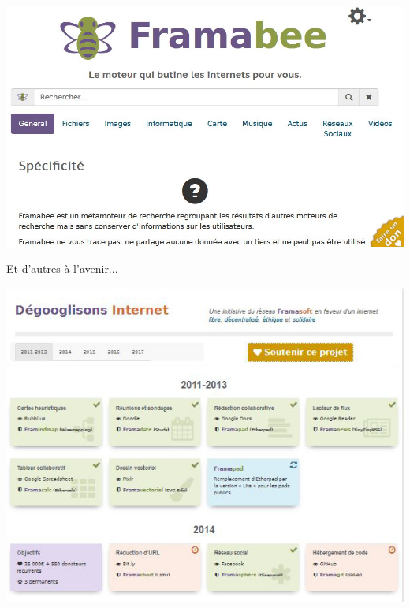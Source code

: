 \documentclass{beamer}
\begin{document}
\begin{frame}
\begin{center}
\includegraphics[scale=0.5]{./images/Framabee.jpg}
\end{center}
\end{frame}


\begin{frame}
\Huge{\centerline{Et d'autres à l'avenir...}}
\end{frame}

\begin{frame}
\begin{center}
\includegraphics[scale=0.5]{./images/Roadmap.jpg}
\end{center}
\end{frame}
\end{document}
